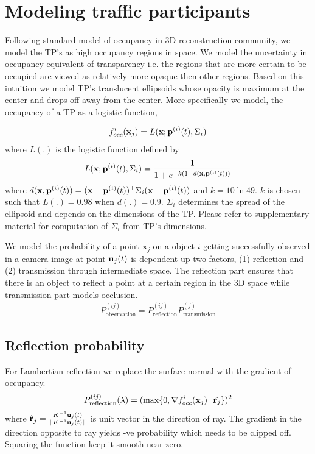 \section{Modeling traffic participants}
\label{sec:TPmodel}
Following standard model of occupancy in 3D reconstruction community, we model
the TP's as high occupancy regions in space. We model the
uncertainty in occupancy equivalent of transparency i.e. the regions that are
more certain to be occupied are viewed as relatively more opaque then other
regions. Based on this intuition we model TP's translucent
ellipsoids whose opacity is maximum at the center and drops off away from the
center. More specifically we model, the occupancy of a TP as a
logistic function, 

\begin{align}
   f^i_{occ}(\mathbf{x}_j) = L(\mathbf{x}; \mathbf{p}^{(i)}(t), \Sigma_i)
\end{align}
where $L(.)$ is the logistic function defined by
\begin{align}
  L(\mathbf{x}; \mathbf{p}^{(i)}(t), \Sigma_i) = \frac{1}{
    1 + e^{-k(1 - d(\mathbf{x},\mathbf{p}^{(i)}(t)))}
    }
\end{align}
where $d(\mathbf{x},\mathbf{p}^{(i)}(t)) =
(\mathbf{x}-\mathbf{p}^{(i)}(t))^\top\Sigma_i(\mathbf{x}-\mathbf{p}^{(i)}(t))$ and $k =
10\ln{49}$. $k$ is chosen such that $L(.) = 0.98$ when $d(.) =
0.9$. $\Sigma_i$ determines the spread of the ellipsoid and depends on the
dimensions of the TP. Please refer to supplementary material 
for computation of $\Sigma_i$ from TP's dimensions.

We model the probability of a point $\mathbf{x}_j$ on a object $i$ getting successfully
observed in a camera image at point $\mathbf{u}_j(t)$ is dependent up two factors,
(1) reflection and (2) transmission through intermediate space. The reflection
part ensures that there is an object to reflect a point at a certain region in
the 3D space while transmission part models occlusion.
\begin{align}
  P^{(ij)}_{\text{observation}} = P^{(ij)}_{\text{reflection}}P^{(j)}_{\text{transmission}}
\end{align}

\subsection{Reflection probability}
For Lambertian reflection we replace the surface normal with the
gradient of occupancy.
%
\begin{align}
  P^{(ij)}_{\text{reflection}}(\lambda) = (\max \{0, \nabla f^i_{occ}(\mathbf{x}_j)^\top
  \hat{\mathbf{r}_j}\})^2
\end{align}
%
where $\hat{\mathbf{r}}_j =
\frac{K^{-1}\mathbf{u}_j(t)}{\|K^{-1}\mathbf{u}_j(t)\|}$ is unit vector in the
direction of ray. The gradient in the direction opposite to ray yields -ve
probability which needs to be clipped off. Squaring the function keep it
smooth near zero.

